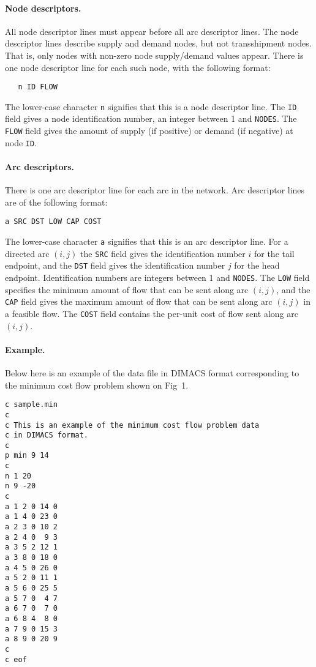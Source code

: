 \paragraph{Node descriptors.} All node descriptor lines must appear
before all arc descriptor lines. The node descriptor lines describe
supply and demand nodes, but not transshipment nodes. That is, only
nodes with non-zero node supply/demand values appear. There is one node
descriptor line for each such node, with the following format:

\begin{verbatim}
   n ID FLOW
\end{verbatim}

\noindent
The lower-case character \verb|n| signifies that this is a node
descriptor line. The \verb|ID| field gives a node identification number,
an integer between 1 and \verb|NODES|. The \verb|FLOW| field gives the
amount of supply (if positive) or demand (if negative) at node
\verb|ID|.

\paragraph{Arc descriptors.} There is one arc descriptor line for each
arc in the network. Arc descriptor lines are of the following format:

\begin{verbatim}
a SRC DST LOW CAP COST
\end{verbatim}

\noindent
The lower-case character \verb|a| signifies that this is an arc
descriptor line. For a directed arc $(i,j)$ the \verb|SRC| field gives
the identification number $i$ for the tail endpoint, and the \verb|DST|
field gives the identification number $j$ for the head endpoint.
Identification numbers are integers between 1 and \verb|NODES|. The
\verb|LOW| field specifies the minimum amount of flow that can be sent
along arc $(i,j)$, and the \verb|CAP| field gives the maximum amount of
flow that can be sent along arc $(i,j)$ in a feasible flow. The
\verb|COST| field contains the per-unit cost of flow sent along arc
$(i,j)$.

\paragraph{Example.} Below here is an example of the data file in
DIMACS format corresponding to the minimum cost flow problem shown on
Fig~1.

\begin{verbatim}
c sample.min
c
c This is an example of the minimum cost flow problem data
c in DIMACS format.
c
p min 9 14
c
n 1 20
n 9 -20
c
a 1 2 0 14 0
a 1 4 0 23 0
a 2 3 0 10 2
a 2 4 0  9 3
a 3 5 2 12 1
a 3 8 0 18 0
a 4 5 0 26 0
a 5 2 0 11 1
a 5 6 0 25 5
a 5 7 0  4 7
a 6 7 0  7 0
a 6 8 4  8 0
a 7 9 0 15 3
a 8 9 0 20 9
c
c eof
\end{verbatim}

